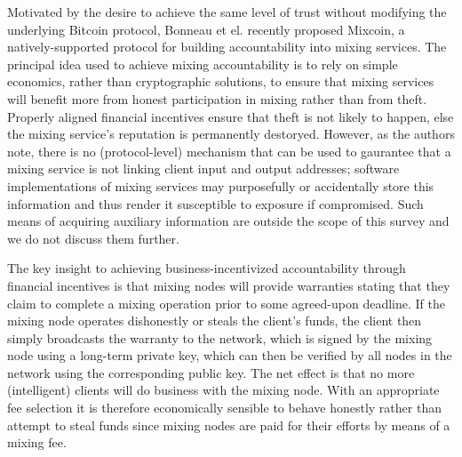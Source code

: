 Motivated by the desire to achieve the same level of trust without modifying the underlying Bitcoin protocol, Bonneau et el. \cite{mixcoin} recently proposed Mixcoin, a natively-supported protocol for building accountability into mixing services. The principal idea used to achieve mixing accountability is to rely on simple economics, rather than cryptographic solutions, to ensure that mixing services will benefit more from honest participation in mixing rather than from theft. Properly aligned financial incentives ensure that theft is not likely to happen, else the mixing service's reputation is permanently destoryed. However, as the authors note, there is no (protocol-level) mechanism that can be used to gaurantee that a mixing service is not linking client input and output addresses; software implementations of mixing services may purposefully or accidentally store this information and thus render it susceptible to exposure if compromised. Such means of acquiring auxiliary information are outside the scope of this survey and we do not discuss them further.

The key insight to achieving business-incentivized accountability through financial incentives is that mixing nodes will provide warranties stating that they claim to complete a mixing operation prior to some agreed-upon deadline. If the mixing node operates dishonestly or steals the client's funds, the client then simply broadcasts the warranty to the network, which is signed by the mixing node using a long-term private key, which can then be verified by all nodes in the network using the corresponding public key. The net effect is that no more (intelligent) clients will do business with the mixing node. With an appropriate fee selection it is therefore economically sensible to behave honestly rather than attempt to steal funds since mixing nodes are paid for their efforts by means of a mixing fee.

